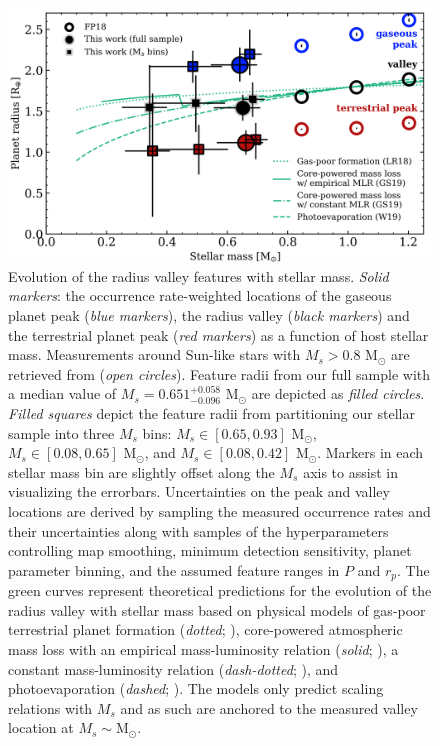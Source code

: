 \documentclass[twocolumn]{emulateapj}
\begin{document}


\begin{figure}
  \centering
  \includegraphics[width=0.9\hsize]{figures/rpvMsFULL_KepK2.png}
  \caption{Evolution of the radius valley features with stellar mass. \emph{Solid markers}:
    the occurrence rate-weighted locations of the gaseous planet peak (\emph{blue markers}), the
    radius valley (\emph{black markers}) and the terrestrial planet peak (\emph{red markers})
    as a function of host stellar mass. Measurements around Sun-like stars with $M_s>0.8$ M$_{\odot}$ are
    retrieved from \cite{fulton18} (\emph{open circles}). Feature radii from our full sample with a median value of
    $M_s = 0.651^{+0.058}_{-0.096}$ M$_{\odot}$ are depicted as \emph{filled circles}. \emph{Filled squares}
    depict the feature radii from partitioning our stellar sample into three $M_s$ bins: $M_s \in [0.65,0.93]$ M$_{\odot}$,
    $M_s \in [0.08,0.65]$ M$_{\odot}$, and $M_s \in [0.08,0.42]$ M$_{\odot}$. Markers in each stellar mass bin are slightly
    offset along the $M_s$ axis to assist in visualizing the errorbars. Uncertainties on the
    peak and valley locations are derived by sampling the measured occurrence rates and their uncertainties along
    with samples of the hyperparameters controlling map smoothing, minimum detection sensitivity, planet parameter
    binning, and the assumed feature ranges in $P$ and $r_p$. The green
    curves represent theoretical predictions for the evolution of the radius valley with stellar mass based on
    physical models of gas-poor terrestrial planet formation (\emph{dotted}; \citealt{lopez18}),
    core-powered atmospheric mass loss
    with an empirical mass-luminosity relation (\emph{solid}; \citealt{gupta19b}), a constant mass-luminosity
    relation (\emph{dash-dotted}; \citealt{gupta19b}), and photoevaporation (\emph{dashed}; \citealt{wu19}).
    The models only predict scaling relations with $M_s$ and as such are anchored to the measured valley location
    at $M_s \sim \text{M}_{\odot}$.}
  \label{fig:rpvMs}
\end{figure}
\end{document}

